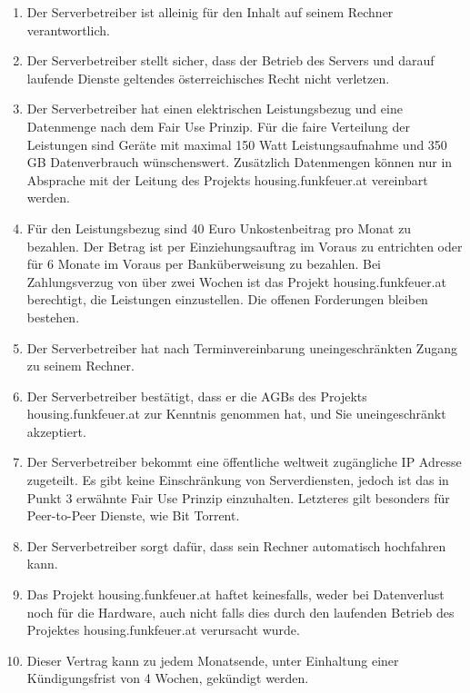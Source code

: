 \documentclass[parskip=half]{scrreprt}
\begin{document}
\begin{contract}
   \begin{enumerate}
\item Der Serverbetreiber ist alleinig für den Inhalt auf seinem Rechner verantwortlich.
\item Der Serverbetreiber stellt sicher, dass der Betrieb des Servers und darauf laufende Dienste geltendes \mbox{österreichisches} Recht nicht verletzen. 
\item Der Serverbetreiber hat einen elektrischen Leistungsbezug und eine Datenmenge nach dem Fair Use Prinzip. Für die faire Verteilung der Leistungen sind Geräte mit maximal 150 Watt Leistungsaufnahme und 350 GB Datenverbrauch wünschenswert. Zusätzlich Datenmengen können nur in Absprache mit der Leitung des Projekts \mbox{housing.funkfeuer.at} vereinbart werden.
\item Für den Leistungsbezug sind 40 Euro Unkostenbeitrag pro Monat zu bezahlen. Der Betrag ist per Einziehungsauftrag im Voraus zu entrichten oder für 6 Monate im Voraus per Banküberweisung zu bezahlen. Bei Zahlungsverzug von über zwei Wochen ist das Projekt housing.funkfeuer.at berechtigt, die Leistungen einzustellen. Die offenen Forderungen bleiben bestehen.
\item Der Serverbetreiber hat nach Terminvereinbarung uneingeschränkten Zugang zu seinem Rechner.
\item Der Serverbetreiber bestätigt, dass er die AGBs des Projekts housing.funkfeuer.at zur Kenntnis genommen hat, und Sie uneingeschränkt akzeptiert.
\item Der Serverbetreiber bekommt eine öffentliche weltweit zugängliche IP Adresse zugeteilt. Es gibt keine Einschränkung von Serverdiensten, jedoch ist das in Punkt 3 erwähnte Fair Use Prinzip einzuhalten. Letzteres gilt besonders für Peer-to-Peer Dienste, wie Bit Torrent.
\item Der Serverbetreiber sorgt dafür, dass sein Rechner automatisch hochfahren kann.
\item Das Projekt housing.funkfeuer.at haftet keinesfalls, weder bei Datenverlust noch für die Hardware, auch nicht falls dies durch den laufenden Betrieb des Projektes housing.funkfeuer.at verursacht wurde.
\item Dieser Vertrag kann zu jedem Monatsende, unter Einhaltung einer Kündigungsfrist von 4 Wochen, gekündigt werden.
\end{enumerate}
\end{contract}

\vspace{1cm}
\end{document}
